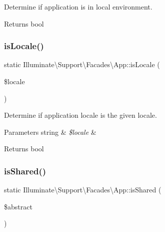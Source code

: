 Determine if application is in local environment.

\begin{DoxyReturn}{Returns}
bool 
\end{DoxyReturn}
\mbox{\label{class_illuminate_1_1_support_1_1_facades_1_1_app_aaf446792c0b06fd9d8ae04eaf49bd0f3}} 
\subsubsection{\texorpdfstring{is\+Locale()}{isLocale()}}
{\footnotesize\ttfamily static Illuminate\textbackslash{}\+Support\textbackslash{}\+Facades\textbackslash{}\+App\+::is\+Locale (\begin{DoxyParamCaption}\item[{}]{\$locale }\end{DoxyParamCaption})\hspace{0.3cm}{\ttfamily [static]}}

Determine if application locale is the given locale.


\begin{DoxyParams}[1]{Parameters}
string & {\em \$locale} & \\
\hline
\end{DoxyParams}
\begin{DoxyReturn}{Returns}
bool 
\end{DoxyReturn}
\mbox{\label{class_illuminate_1_1_support_1_1_facades_1_1_app_a345cc220f504fb29e2345e66f4817a4a}} 
\subsubsection{\texorpdfstring{is\+Shared()}{isShared()}}
{\footnotesize\ttfamily static Illuminate\textbackslash{}\+Support\textbackslash{}\+Facades\textbackslash{}\+App\+::is\+Shared (\begin{DoxyParamCaption}\item[{}]{\$abstract }\end{DoxyParamCaption})\hspace{0.3cm}{\ttfamily [static]}}


